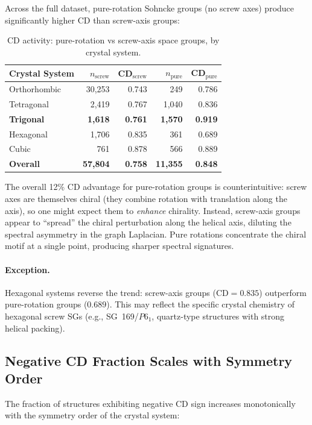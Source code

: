 \documentclass[11pt,a4paper]{article}
\begin{document}
Across the full dataset, pure-rotation Sohncke groups (no screw axes) produce significantly higher CD than screw-axis groups:

\begin{table}[H]
\centering
\caption{CD activity: pure-rotation vs screw-axis space groups, by crystal system.}
\label{tab:screw}
\begin{tabular}{lrrrr}
\toprule
Crystal System & $n_{\text{screw}}$ & CD$_{\text{screw}}$ & $n_{\text{pure}}$ & CD$_{\text{pure}}$ \\
\midrule
Orthorhombic & 30,253 & 0.743 & 249 & 0.786 \\
Tetragonal & 2,419 & 0.767 & 1,040 & 0.836 \\
\textbf{Trigonal} & \textbf{1,618} & \textbf{0.761} & \textbf{1,570} & \textbf{0.919} \\
Hexagonal & 1,706 & 0.835 & 361 & 0.689 \\
Cubic & 761 & 0.878 & 566 & 0.889 \\
\midrule
\textbf{Overall} & \textbf{57,804} & \textbf{0.758} & \textbf{11,355} & \textbf{0.848} \\
\bottomrule
\end{tabular}
\end{table}

\noindent The overall 12\% CD advantage for pure-rotation groups is counterintuitive: screw axes are themselves chiral (they combine rotation with translation along the axis), so one might expect them to \emph{enhance} chirality. Instead, screw-axis groups appear to ``spread'' the chiral perturbation along the helical axis, diluting the spectral asymmetry in the graph Laplacian. Pure rotations concentrate the chiral motif at a single point, producing sharper spectral signatures.

\paragraph{Exception.} Hexagonal systems reverse the trend: screw-axis groups ($\text{CD} = 0.835$) outperform pure-rotation groups ($0.689$). This may reflect the specific crystal chemistry of hexagonal screw SGs (e.g., SG~169/$P6_1$, quartz-type structures with strong helical packing).

\subsection{Negative CD Fraction Scales with Symmetry Order}

The fraction of structures exhibiting negative CD sign increases monotonically with the symmetry order of the crystal system:
\end{document}
